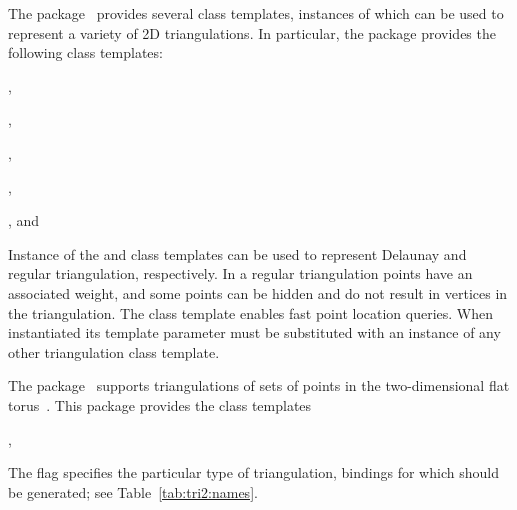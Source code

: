 The \iiDTriangulationsPackage{} package~\cite{cgal:y-t2-21a} provides several class templates, instances of which can be used to represent a variety of 2D triangulations. In particular, the package provides the following class templates:
\begin{compactenum}
\item {},
\item {},
\item {},
\item {},
\item {}, and
\item {}
\end{compactenum}
Instance of the  and  class templates can be used to represent Delaunay and regular triangulation, respectively. In a regular triangulation points have an associated weight, and some points can be hidden and do not result in vertices in the triangulation. The class template  enables fast point location queries. When instantiated its template parameter must be substituted with an instance of any other triangulation class template.

The \iiDPeriodicTriangulationsPackage{} package~\cite{cgal:k-pt2-13-21a} supports triangulations of sets of points in the two-dimensional flat torus~\cite{ct-cpt-09}. This package provides the class templates
\begin{compactenum}
\item {},
\item {}
\item {}
\end{compactenum}

The \cmake{} flag  specifies the particular type of triangulation, bindings for which should be generated; see Table~\ref{tab:tri2:names}.

